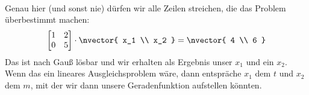 {\begin{align*}
{			}
		\end{align*}
		Genau hier (und sonst nie) dürfen wir alle Zeilen streichen, die das Problem überbestimmt machen:
		\begin{align*}
			\begin{bmatrix}
				1 & 2 \\
				0 & 5 \\
			\end{bmatrix} \cdot 
			\nvector{
				x_1 \\ x_2
			} = 
			\nvector{
				4 \\ 6
			}
		\end{align*}
		Das ist nach Gauß lösbar und wir erhalten als Ergebnis unser $x_1$ und ein $x_2$. Wenn das ein lineares Ausgleichsproblem wäre, dann entspräche $x_1$ dem $t$ und $x_2$ dem $m$, mit der wir dann unsere Geradenfunktion aufstellen könnten.
	}
	
	\sbreak
	